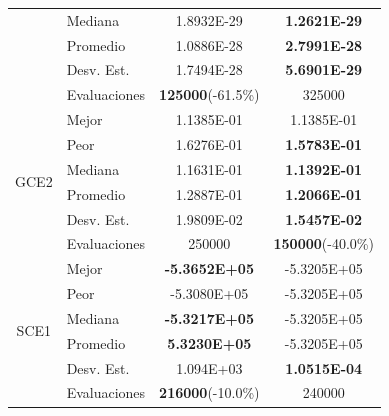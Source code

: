 \begin{table}
\begin{tabular}{clcc}
		& Mediana      &1.8932E-29&\textbf{1.2621E-29}\\
		& Promedio     &1.0886E-28&\textbf{2.7991E-28} \\
		& Desv. Est.   &1.7494E-28&\textbf{5.6901E-29}\\
		& Evaluaciones &\textbf{125000}(-61.5\%)&325000 \\
		\hline
		\multirow{6}{*}{GCE2} & Mejor        &1.1385E-01&1.1385E-01\\
		& Peor         &1.6276E-01&\textbf{1.5783E-01}\\
		& Mediana      &1.1631E-01&\textbf{1.1392E-01 }\\
		& Promedio     &1.2887E-01&\textbf{1.2066E-01  }\\
		& Desv. Est.   &1.9809E-02&\textbf{1.5457E-02 }\\
		& Evaluaciones &250000&\textbf{150000}(-40.0\%) \\
		\hline
		
		
		\multirow{6}{*}{SCE1} & Mejor        &\textbf{-5.3652E+05}&-5.3205E+05 \\
		& Peor         &-5.3080E+05&-5.3205E+05\\
		& Mediana      &\textbf{-5.3217E+05}&-5.3205E+05\\
		& Promedio     &\textbf{5.3230E+05}&-5.3205E+05\\
		& Desv. Est.   &1.094E+03&\textbf{1.0515E-04}\\
		& Evaluaciones &\textbf{216000}(-10.0\%)&240000 \\
		
		
		\hline
	\end{tabular}
\end{table}


